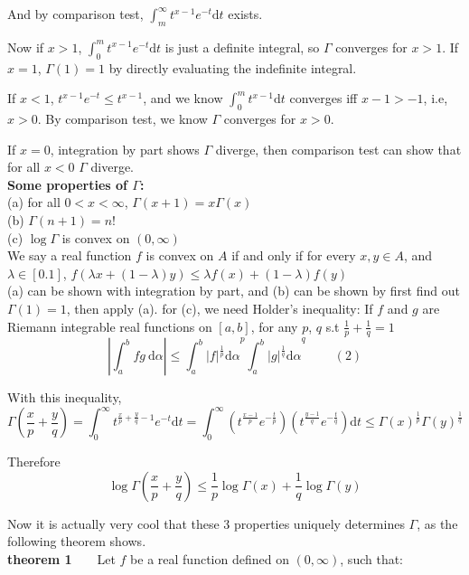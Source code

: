 \documentclass[a4paper,12pt]{article}
\begin{document}
And by comparison test, $\int_m^{\infty} t^{x-1}e^{-t} \mathrm{d}t$ exists.

Now if $x > 1$,  $\int_0^m t^{x-1}e^{-t} \mathrm{d}t$ is just a definite integral, so $\Gamma$ converges for $x>1$. If $x=1$, $\Gamma(1) = 1$ by directly evaluating the indefinite integral.

If $x<1$, $t^{x-1}e^{-t} \leq t^{x-1}$, and we know $\int_0^m t^{x-1} \mathrm{d}t$ converges iff $x-1>-1$, i.e, $x>0$. By comparison test, we know $\Gamma$ converges for $x>0$.

If $x=0$, integration by part shows $\Gamma$ diverge, then comparison test can show that for all $x<0$ $\Gamma$ diverge.\\

\textbf{Some properties of $\Gamma$:}\\
(a) for all $0<x<\infty$, $\Gamma(x+1) = x\Gamma(x)$ \\
(b) $\Gamma(n+1) = n!$\\
(c) $\log \Gamma$ is convex on $(0, \infty)$\\
We say a real function $f$ is convex on $A$ if and only if for every $x, y\in A$, and $\lambda \in [0.1]$, $f(\lambda x + (1-\lambda)y) \leq \lambda f(x) + (1-\lambda)f(y)$\\

(a) can be shown with integration by part, and (b) can be shown by first find out $\Gamma(1)=1$, then apply (a). for (c), we need Holder's inequality:
{\center}
If $f$ and $g$ are Riemann integrable real functions on $[a, b]$, for any $p$, $q$ s.t $\frac{1}{p} + \frac{1}{q} = 1$
$$|\int_a^b fg\ \mathrm{d}\alpha| \leq {\int_a^b |f|^{\frac{1}{p}}\mathrm{d}\alpha}^p {\int_a^b |g|^{\frac{1}{q}}\mathrm{d}\alpha}^q\ \ \ \ \ \ \ \ \ \ (2) $$
{\center}

With this inequality, 
$$\Gamma(\frac{x}{p} + \frac{y}{q}) = 
\int_0^\infty t^{\frac{x}{p} + \frac{y}{q} - 1}e^{-t} \mathrm{d}t = 
\int_0^\infty (t^\frac{x-1}{p}e^{-\frac{t}{p}}) (t^\frac{y-1}{q}e^{-\frac{t}{q}}) \mathrm{d}t \leq \Gamma(x) ^ {\frac{1}{p}} \Gamma(y) ^ {\frac{1}{q}}$$

Therefore
$$\log\Gamma( \frac{x}{p} + \frac{y}{q} ) \leq \frac{1}{p}\log\Gamma(x)+ \frac{1}{q}\log\Gamma(y)$$ 

Now it is actually very cool that these 3 properties uniquely determines $\Gamma$, as the following theorem shows.\\

\textbf{theorem 1}\ \ \ \ 
Let $f$ be a real function defined  on $(0, \infty)$, such that:
\end{document}
